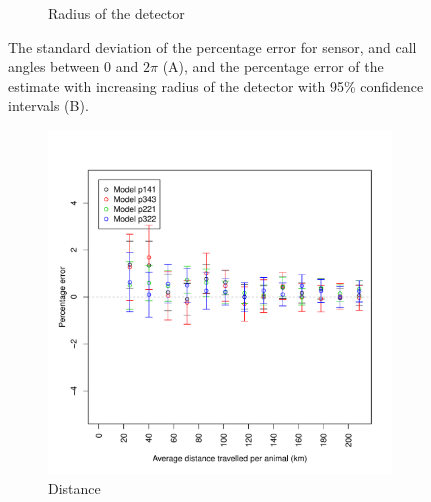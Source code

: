 \documentclass[a4paper,10pt,reqno,oneside]{amsart}
\begin{document}
\begin{figure}[t]
\begin{subfigure}[t]{0.5\textwidth}
                \caption{Radius of the detector}
                \label{f:Radii}
        \end{subfigure}
        \label{f:Cameras}
        \caption{ The standard deviation of the percentage error for sensor, and call angles between 0 and $2\pi$ (A), and
        the percentage error of the estimate with increasing radius of the detector with 95\% confidence intervals (B).
        } 
\end{figure}

\begin{figure}[t]
        \centering
        \begin{subfigure}[t]{0.5\textwidth}
                \centering
		\includegraphics[width=1\textwidth]{imgs/ResultsDistanceSubsample.pdf}
                \caption{Distance}
                \label{f:Distance}
        \end{subfigure}
        ~ 
        \begin{subfigure}[t]{0.5\textwidth}
                \centering

\end{subfigure}
\end{figure}
\end{document}
